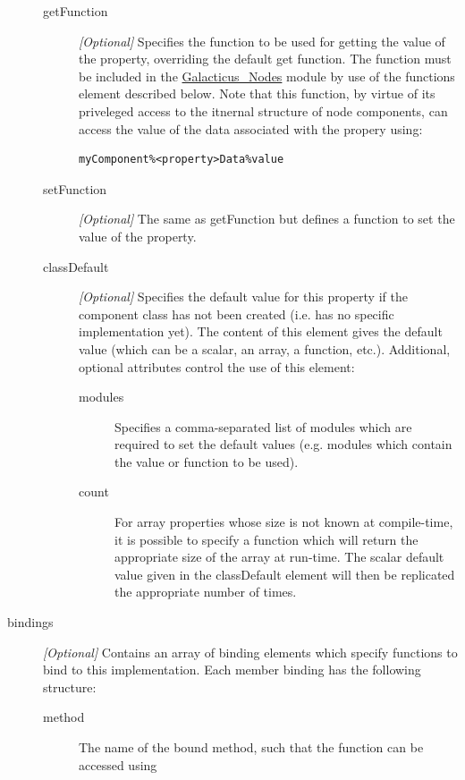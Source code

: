 \begin{description}
\begin{description}
\item [{\normalfont \ttfamily getFunction}] \emph{[Optional]} Specifies the function to be used for getting the value of the property, overriding the default get function. The function must be included in the \hyperlink{objects.nodes.F90:galacticus_nodes}{\normalfont \ttfamily Galacticus\_Nodes} module by use of the {\normalfont \ttfamily functions} element described below. Note that this function, by virtue of its priveleged access to the itnernal structure of node components, can access the value of the data associated with the propery using:
\begin{verbatim}
myComponent%<property>Data%value
\end{verbatim}
\item [{\normalfont \ttfamily setFunction}] \emph{[Optional]} The same as {\normalfont \ttfamily getFunction} but defines a function to set the value of the property.
\item [{\normalfont \ttfamily classDefault}] \emph{[Optional]} Specifies the default value for this property if the component class has not been created (i.e. has no specific implementation yet). The content of this element gives the default value (which can be a scalar, an array, a function, etc.). Additional, optional attributes control the use of this element:
\begin{description}
 \item [{\normalfont \ttfamily modules}] Specifies a comma-separated list of modules which are required to set the default values (e.g. modules which contain the value or function to be used).
 \item [{\normalfont \ttfamily count}] For array properties whose size is not known at compile-time, it is possible to specify a function which will return the appropriate size of the array at run-time. The scalar default value given in the {\normalfont \ttfamily classDefault} element will then be replicated the appropriate number of times.
\end{description}
\end{description}
\item [{\normalfont \ttfamily bindings}] \emph{[Optional]} Contains an array of {\normalfont \ttfamily binding} elements which specify functions to bind to this implementation. Each member {\normalfont \ttfamily binding} has the following structure:
\begin{description}
\item [{\normalfont \ttfamily method}] The name of the bound method, such that the function can be accessed using

\end{description}
\end{description}

